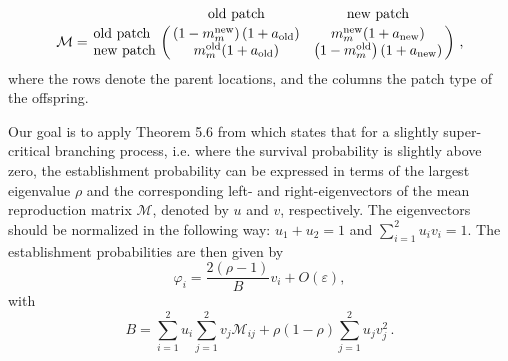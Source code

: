 \documentclass[a4paper,11pt]{scrartcl}
\newcommand{\chg}[1]{\textcolor{change}{#1}}
\begin{document}
\begin{equation}\label{Seq:mean_repro}
	\mathcal{M} = \bordermatrix{ ~ & \text{old patch} & \text{new patch} \cr
		\text{old patch} & \left(1-m_m^{\text{new}}\right) (1+a_{\text{old}}) & m_m^{\text{new}} (1+a_{\text{new}}) \cr
		\text{new patch} & m_m^{\text{old}} (1+a_{\text{old}}) & \left(1-m_m^{\text{old}}\right) (1+a_{\text{new}})
		}\ ,
\end{equation}
where the rows denote the parent locations, and the columns the patch type of the offspring.

Our goal is to apply Theorem 5.6 from \citet{haccou_book} which states that for a slightly super-critical branching process, \chg{i.e. where the survival probability is slightly above zero}, the establishment probability can be expressed in terms of the largest eigenvalue $\rho$ and the corresponding left- and right-eigenvectors of the mean reproduction matrix \chg{$\mathcal{M}$}, denoted by $u$ and $v$, respectively. The eigenvectors should be normalized in the following way: $u_1+u_2 = 1$ and $\sum_{i=1}^2 u_i v_i = 1$. The establishment probabilities are then given by 
\begin{equation}\label{Seq:theory}
	\varphi_i = \frac{2(\rho-1)}{B} v_i + O(\varepsilon), 
\end{equation}
with
\begin{equation} 
	B = \sum_{i=1}^2 u_i \sum_{j=1}^2 v_j \mathcal{M}_{ij} + \rho(1-\rho) \sum_{j=1}^2 u_j v_j^2\, . 
\end{equation} 
\end{document}
